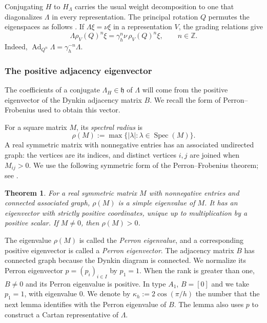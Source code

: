 \documentclass[11pt,leqno]{amsart}
\numberwithin{equation}{section}
\theoremstyle{plain}
\newtheorem{theorem}{Theorem}[section]
\theoremstyle{definition}
\theoremstyle{plain}
\theoremstyle{definition}
\theoremstyle{remark}
\newcommand{\gh}{\mathfrak h}
\begin{document}
Conjugating $H$ to $H_\Lambda$ carries the usual weight decomposition to one that diagonalizes $\Lambda$ in every representation.  The principal rotation $Q$ permutes the eigenspaces as follows \cite[Lemma~3.1]{MRV2016}.  If $\Lambda\xi=\nu\xi$ in a representation $V$, the grading relations give
\begin{equation}\label{eq:rotated-cyclic-vector}
 \Lambda\rho_V(Q)^n\xi=\gamma_h^n\nu\,\rho_V(Q)^n\xi,
 \qquad n\in\mathbb Z.
\end{equation}
Indeed, $\operatorname{Ad}_{Q^n}\Lambda=\gamma_h^{-n}\Lambda$.

\subsubsection{The positive adjacency eigenvector}
The coefficients of a conjugate $\Lambda_H\in\gh$ of $\Lambda$ will come from the positive eigenvector of the Dynkin adjacency matrix $B$.  We recall the form of Perron--Frobenius used to obtain this vector.

For a square matrix $M$, its \emph{spectral radius} is
\[
 \rho(M):=\max\{ |\lambda|:\lambda\in\operatorname{Spec}(M)\}.
\]
A real symmetric matrix with nonnegative entries has an associated undirected graph: the vertices are its indices, and distinct vertices $i,j$ are joined when $M_{ij}>0$.  We use the following symmetric form of the Perron--Frobenius theorem; see \cite[Chapter~8]{HornJohnson1985}.
\begin{theorem}\label{thm:symmetric-Perron-Frobenius}
For a real symmetric matrix $M$ with nonnegative entries and connected associated graph, $\rho(M)$ is a simple eigenvalue of $M$.  It has an eigenvector with strictly positive coordinates, unique up to multiplication by a positive scalar.  If $M\ne0$, then $\rho(M)>0$.
\end{theorem}

The eigenvalue $\rho(M)$ is called the \emph{Perron eigenvalue}, and a corresponding positive eigenvector is called a \emph{Perron eigenvector}.  The adjacency matrix $B$ has connected graph because the Dynkin diagram is connected.  We normalize its Perron eigenvector $p=(p_i)_{i\in I}$ by $p_1=1$.  When the rank is greater than one, $B\ne0$ and its Perron eigenvalue is positive.  In type $A_1$, $B=[0]$ and we take $p_1=1$, with eigenvalue $0$.  We denote by $\kappa_h:=2\cos(\pi/h)$ the number that the next lemma identifies with the Perron eigenvalue of $B$.  The lemma also uses $p$ to construct a Cartan representative of $\Lambda$.
\end{document}
